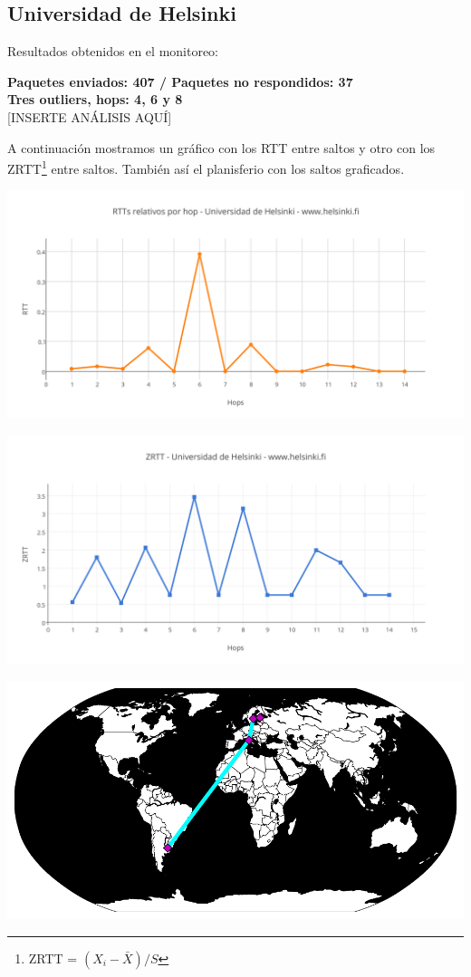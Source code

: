 \subsection{Universidad de Helsinki}

Resultados obtenidos en el monitoreo:\\

\smallskip

\bigskip

\textbf{Paquetes enviados: 407 / Paquetes no respondidos: 37}\\

\textbf{Tres outliers, hops: 4, 6 y 8}\\

[INSERTE ANÁLISIS AQUÍ]

A continuación mostramos un gráfico con los RTT entre saltos y otro con los ZRTT\footnote{ZRTT = $(X_i - \bar{X}) / S$}  entre saltos. También así el planisferio con los saltos graficados.

\includegraphics[scale=0.65]{imagenes/helsinki/RTTs.png} 

\includegraphics[scale=0.65]{imagenes/helsinki/ZRTTs.png} 

\begin{center}
\includegraphics[scale=0.8]{imagenes/helsinki/helsinki.pdf} 
\end{center}